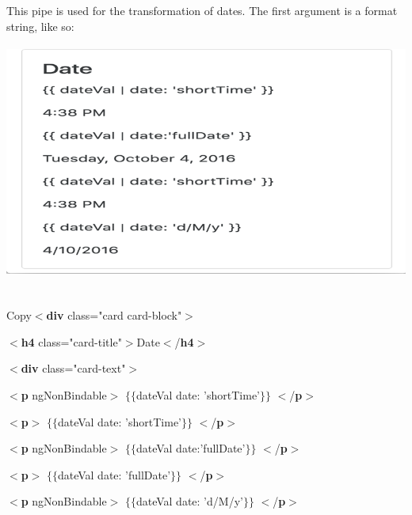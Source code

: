 \documentclass{article}
\begin{document}
\noindent This pipe is used for the transformation of dates. The first argument is a format string, like so:

\begin{center}
	\noindent \includegraphics*[width=5.43in, height=3.06in]{IMG-03-02}
\end{center}

\noindent 

\noindent 

\noindent \\ Copy$\mathrm{<}$\textbf{div} class="card card-block"$\mathrm{>}$

$\mathrm{<}$\textbf{h4} class="card-title"$\mathrm{>}$Date$\mathrm{<}$/\textbf{h4}$\mathrm{>}$

$\mathrm{<}$\textbf{div} class="card-text"$\mathrm{>}$

$\mathrm{<}$\textbf{p} ngNonBindable$\mathrm{>}$ $\mathrm{\{}$$\mathrm{\{}$dateVal {\textbar} date: 'shortTime'$\mathrm{\}}$$\mathrm{\}}$ $\mathrm{<}$/\textbf{p}$\mathrm{>}$

$\mathrm{<}$\textbf{p}$\mathrm{>}$ $\mathrm{\{}$$\mathrm{\{}$dateVal {\textbar} date: 'shortTime'$\mathrm{\}}$$\mathrm{\}}$ $\mathrm{<}$/\textbf{p}$\mathrm{>}$

$\mathrm{<}$\textbf{p} ngNonBindable$\mathrm{>}$ $\mathrm{\{}$$\mathrm{\{}$dateVal {\textbar} date:'fullDate'$\mathrm{\}}$$\mathrm{\}}$ $\mathrm{<}$/\textbf{p}$\mathrm{>}$

$\mathrm{<}$\textbf{p}$\mathrm{>}$ $\mathrm{\{}$$\mathrm{\{}$dateVal {\textbar} date: 'fullDate'$\mathrm{\}}$$\mathrm{\}}$ $\mathrm{<}$/\textbf{p}$\mathrm{>}$

$\mathrm{<}$\textbf{p} ngNonBindable$\mathrm{>}$ $\mathrm{\{}$$\mathrm{\{}$dateVal {\textbar} date: 'd/M/y'$\mathrm{\}}$$\mathrm{\}}$ $\mathrm{<}$/\textbf{p}$\mathrm{>}$
\end{document}
